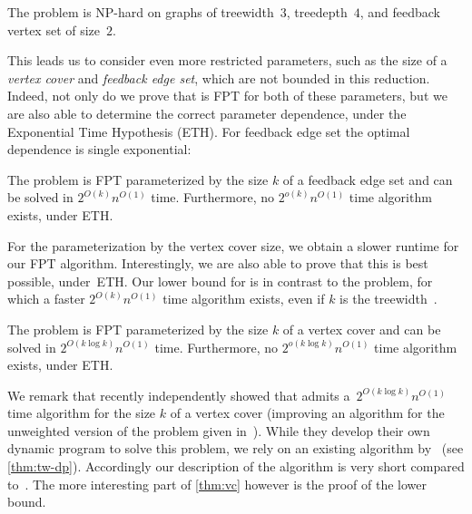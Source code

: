 \begin{theorem}
The \SF problem is NP-hard on graphs of treewidth~$3$, treedepth~$4$, and feedback vertex set of size~$2$.
\end{theorem}

This leads us to consider even more restricted parameters, such as the size of
a \emph{vertex cover} and \emph{feedback edge set}, which are not bounded in
this reduction. Indeed, not only do we prove that \SF is FPT for both of these
parameters, but we are also able to determine the correct parameter dependence,
under the Exponential Time Hypothesis (ETH). For feedback edge set the optimal dependence is single
exponential:  

\begin{theorem}\label{thm:fes}
The \SF problem is FPT parameterized by the size $k$ of a feedback edge set and can be solved in $2^{O(k)}n^{O(1)}$ time.
Furthermore, no $2^{o(k)}n^{O(1)}$ time algorithm exists, under ETH.
\end{theorem}

For the parameterization by the vertex cover size, we obtain a slower runtime
for our FPT algorithm. Interestingly, we are also able to prove that this is
best possible, under~ETH. Our lower bound for \SF is in contrast to the \ST
problem, for which a faster $2^{O(k)}n^{O(1)}$ time algorithm exists, even if
$k$ is the treewidth~\cite{bodlaender2015deterministic}.

\begin{theorem}\label{thm:vc}
The \SF problem is FPT parameterized by the size $k$ of a vertex cover and can be solved in $2^{O(k\log k)}n^{O(1)}$ time. Furthermore, no $2^{o(k\log k)}n^{O(1)}$ time algorithm exists, under ETH.
\end{theorem}

We remark that \citet{bodlaender2023complexity} recently independently showed 
that \SF admits a~$2^{O(k\log k)}n^{O(1)}$ time algorithm for the size $k$ of a 
vertex cover (improving an algorithm for the unweighted version of the problem 
given in~\cite{GimaHKKO22}). While they develop their own dynamic program to 
solve this problem, we rely on an existing algorithm 
by~\cite{bateni2011approximation} (see \autoref{thm:tw-dp}). Accordingly our 
description of the algorithm is very short compared 
to~\cite{bodlaender2023complexity}. The more interesting part of 
\autoref{thm:vc} however is the proof of the lower bound.

%
%
%

